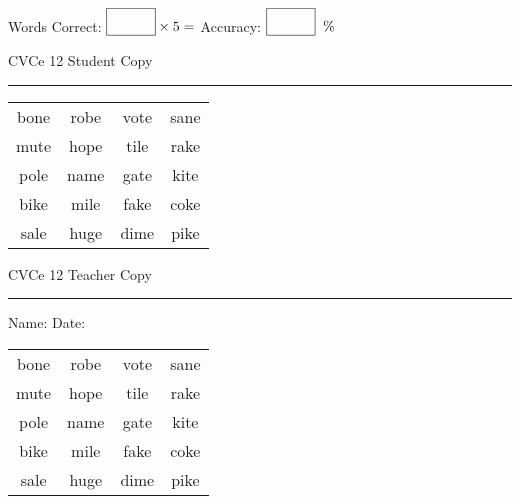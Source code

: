 \documentclass{memoir}
\begin{document}
\small

Words Correct: $\fbox{\phantom{\huge 100}} \times 5 = $ Accuracy: $\fbox{\phantom{\huge 100}}\;\; \%$ 

\vfill

\newpage


\footnotesize \noindent
CVCe 12 \hfill Student Copy
\smallskip
\hrule

\Large

\setlength{\tabcolsep}{14pt}
\def\arraystretch{2}

{\selectfont


\begin{vplace}[0.5]
\begin{center}
\begin{tabular}{cccc}
bone & robe & vote & sane \\
mute & hope & tile & rake \\
pole & name & gate & kite \\
bike & mile & fake & coke \\
sale & huge & dime & pike \\
\end{tabular}
\end{center}
\end{vplace}

}

\newpage

\footnotesize \noindent
CVCe 12 \hfill Teacher Copy
\smallskip
\hrule

\small

\vfill

\noindent
Name: \underline{\hspace{1.75in}} \hfill Date: \underline{\hspace{1in}}

\Large

{\selectfont


\begin{vplace}[0.5]
\begin{center}
\begin{tabular}{cccc}
bone & robe & vote & sane \\
mute & hope & tile & rake \\
pole & name & gate & kite \\
bike & mile & fake & coke \\
sale & huge & dime & pike \\
\end{tabular}
\end{center}
\end{vplace}



}
\end{document}
